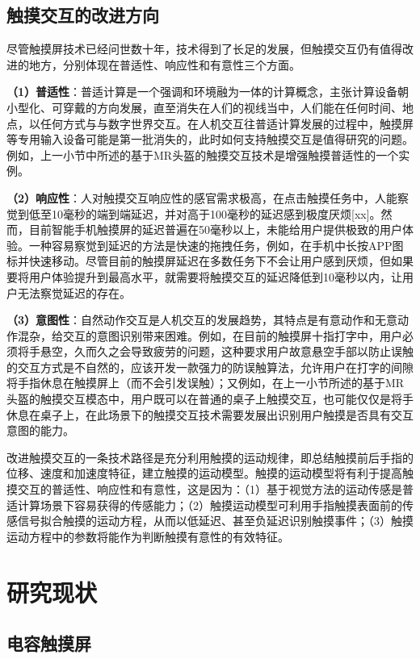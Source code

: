 \subsection{触摸交互的改进方向}

尽管触摸屏技术已经问世数十年，技术得到了长足的发展，但触摸交互仍有值得改进的地方，分别体现在普适性、响应性和有意性三个方面。

\textbf{（1）普适性}：普适计算是一个强调和环境融为一体的计算概念，主张计算设备朝小型化、可穿戴的方向发展，直至消失在人们的视线当中，人们能在任何时间、地点，以任何方式与与数字世界交互。在人机交互往普适计算发展的过程中，触摸屏等专用输入设备可能是第一批消失的，此时如何支持触摸交互是值得研究的问题。例如，上一小节中所述的基于MR头盔的触摸交互技术是增强触摸普适性的一个实例。

\textbf{（2）响应性}：人对触摸交互响应性的感官需求极高，在点击触摸任务中，人能察觉到低至10毫秒的端到端延迟，并对高于100毫秒的延迟感到极度厌烦[xx]。然而，目前智能手机触摸屏的延迟普遍在50毫秒以上，未能给用户提供极致的用户体验。一种容易察觉到延迟的方法是快速的拖拽任务，例如，在手机中长按APP图标并快速移动。尽管目前的触摸屏延迟在多数任务下不会让用户感到厌烦，但如果要将用户体验提升到最高水平，就需要将触摸交互的延迟降低到10毫秒以内，让用户无法察觉延迟的存在。

\textbf{（3）意图性}：自然动作交互是人机交互的发展趋势，其特点是有意动作和无意动作混杂，给交互的意图识别带来困难。例如，在目前的触摸屏十指打字中，用户必须将手悬空，久而久之会导致疲劳的问题，这种要求用户故意悬空手部以防止误触的交互方式是不自然的，应该开发一款强力的防误触算法，允许用户在打字的间隙将手指休息在触摸屏上（而不会引发误触）；又例如，在上一小节所述的基于MR头盔的触摸交互模态中，用户既可以在普通的桌子上触摸交互，也可能仅仅是将手休息在桌子上，在此场景下的触摸交互技术需要发展出识别用户触摸是否具有交互意图的能力。

改进触摸交互的一条技术路径是充分利用触摸的运动规律，即总结触摸前后手指的位移、速度和加速度特征，建立触摸的运动模型。触摸的运动模型将有利于提高触摸交互的普适性、响应性和有意性，这是因为：（1）基于视觉方法的运动传感是普适计算场景下容易获得的传感能力；（2）触摸运动模型可利用手指触摸表面前的传感信号拟合触摸的运动方程，从而以低延迟、甚至负延迟识别触摸事件；（3）触摸运动方程中的参数将能作为判断触摸有意性的有效特征。

\section{研究现状}

\subsection{电容触摸屏}

